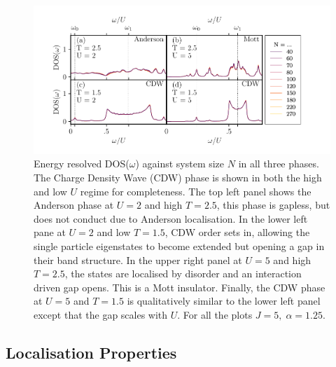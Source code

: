 \hypertarget{fig:DOS}{%
\begin{figure}
\centering
\includegraphics[width=1\textwidth,height=\textheight]{figure_code/fk_chapter/DOS/DOS}
\caption[{Energy resolved DOS(\(\omega\)) in the difference phases.}]{Energy resolved DOS(\(\omega\)) against system size \(N\) in all three phases. The Charge Density Wave (CDW) phase is shown in both the high and low \(U\) regime for completeness. The top left panel shows the Anderson phase at \(U = 2\) and high \(T = 2.5\), this phase is gapless, but does not conduct due to Anderson localisation. In the lower left pane at \(U = 2\) and low \(T = 1.5\), CDW order sets in, allowing the single particle eigenstates to become extended but opening a gap in their band structure. In the upper right panel at \(U = 5\) and high \(T = 2.5\), the states are localised by disorder and an interaction driven gap opens. This is a Mott insulator. Finally, the CDW phase at \(U = 5\) and \(T = 1.5\) is qualitatively similar to the lower left panel except that the gap scales with \(U\). For all the plots \(J = 5,\;\alpha = 1.25\).}
\label{fig:DOS}
\end{figure}
}

\hypertarget{localisation-properties}{%
\subsection{Localisation Properties}\label{localisation-properties}}

